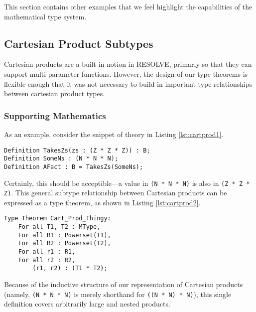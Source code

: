 This section contains other examples that we feel highlight the capabilities of the mathematical type system.

	\subsection{Cartesian Product Subtypes}	%

Cartesian products are a built-in notion in RESOLVE, primarly so that they can support multi-parameter functions.  However, the design of our type theorems is flexible enough that it was not necessary to build in important type-relationships between cartesian product types.

		\subsubsection{Supporting Mathematics}	%

As an example, consider the snippet of theory in Listing \ref{lst:cartprod1}.

\begin{lstlisting}[float=h,language=resolve,caption={Passing a Cartesian product subtype\label{lst:cartprod1}}]
Definition TakesZs(zs : (Z * Z * Z)) : B;
Definition SomeNs : (N * N * N);
Definition AFact : B = TakesZs(SomeNs);
\end{lstlisting}

Certainly, this should be acceptible---a value in \texttt{(N * N * N)} is also in \texttt{(Z * Z * Z)}.  This general subtype relationship between Cartesian products can be expressed as a type theorem, as shown in Listing \ref{lst:cartprod2}.

\begin{lstlisting}[float=h,language=resolve,caption={A type theorem expressing Cartesian subtypes\label{lst:cartprod2}}]
Type Theorem Cart_Prod_Thingy:
	For all T1, T2 : MType,
	For all R1 : Powerset(T1),
	For all R2 : Powerset(T2),
	For all r1 : R1,
	For all r2 : R2,
		(r1, r2) : (T1 * T2);
\end{lstlisting}

Because of the inductive structure of our representation of Cartesian products (namely, \texttt{(N~*~N~*~N)} is merely shorthand for \texttt{((N~*~N)~*~N)}), this single definition covers arbitrarily large and nested products.

